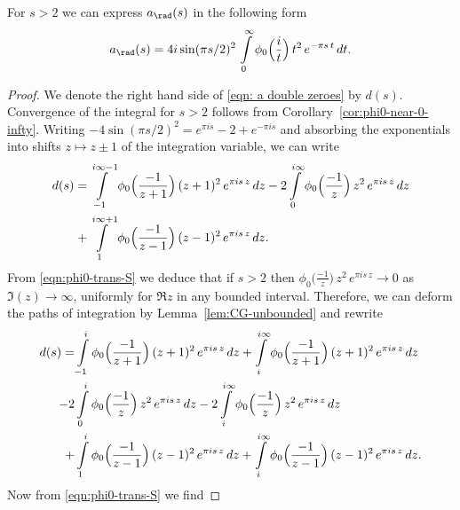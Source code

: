 \begin{proposition}
\label{prop:a-double-zeros}
\leanok
For $s>2$ we can express $a_\rad(s)$ in the following form
\begin{equation}\label{eqn: a double zeroes}
    a_\rad(s)=4i\sin(\pi s/2)^2\,\int\limits_{0}^{\infty}\phi_0\Big(\frac{i}{t}\Big)\,t^2\,e^{-\pi s \,t}\,dt.
\end{equation}
\end{proposition}
\begin{proof}
We denote the right hand side of \eqref{eqn: a double zeroes} by $d(s)$.
Convergence of the integral for $s > 2$ follows from Corollary~\ref{cor:phi0-near-0-infty}.
Writing $-4\sin(\pi s/2)^2 = e^{\pi i s} - 2 + e^{-\pi i s}$ and absorbing the exponentials into shifts $z \mapsto z \pm 1$ of the integration variable, we can write
\begin{align}
    d(s)=&\int\limits_{-1}^{i\infty-1}\phi_0\Big(\frac{-1}{z+1}\Big)\,(z+1)^2\,e^{\pi i s \,z}\,dz-
    2\int\limits_{0}^{i\infty}\phi_0\Big(\frac{-1}{z}\Big)\,z^2\,e^{\pi i s \,z}\,dz\notag\\
    +&\int\limits_{1}^{i\infty+1}\phi_0\Big(\frac{-1}{z-1}\Big)\,(z-1)^2\,e^{\pi i s \,z}\,dz.\notag
\end{align}
From \eqref{eqn:phi0-trans-S} we deduce that if $s>2$ then
$\phi_0\Big(\frac{-1}{z}\Big)\,z^2\,e^{\pi i s \,z}\to 0$ as $\Im(z)\to\infty$, uniformly for $\Re z$ in any bounded interval. Therefore, we can deform the paths of integration by Lemma~\ref{lem:CG-unbounded}
and rewrite
\begin{align}
    d(s)=&\int\limits_{-1}^{i}\phi_0\Big(\frac{-1}{z+1}\Big)\,(z+1)^2\,e^{\pi i s \,z}\,dz
    +\int\limits_{i}^{i\infty}\phi_0\Big(\frac{-1}{z+1}\Big)\,(z+1)^2\,e^{\pi i s \,z}\,dz\notag\\
    -2&\int\limits_{0}^{i}\phi_0\Big(\frac{-1}{z}\Big)\,z^2\,e^{\pi i s \,z}\,dz
    -2\int\limits_{i}^{i\infty}\phi_0\Big(\frac{-1}{z}\Big)\,z^2\,e^{\pi i s \,z}\,dz\notag\\
    +&\int\limits_{1}^{i}\phi_0\Big(\frac{-1}{z-1}\Big)\,(z-1)^2\,e^{\pi i s \,z}\,dz
    +\int\limits_{i}^{i\infty}\phi_0\Big(\frac{-1}{z-1}\Big)\,(z-1)^2\,e^{\pi i s \,z}\,dz.\notag
\end{align}
Now from \eqref{eqn:phi0-trans-S} we find

\end{proof}
